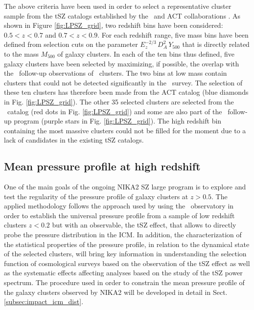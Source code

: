 \documentclass[twocolumn,traditabstract]{aa}
\begin{document}
The above criteria have been used in order to select a representative cluster sample from the tSZ catalogs established by the \planck\ and ACT collaborations \citep{pla16b,hil18}. As shown in Figure \ref{fig:LPSZ_grid}, two redshift bins have been considered: $0.5<z<0.7$ and $0.7<z<0.9$. For each redshift range, five mass bins have been defined from selection cuts on the parameter $E_z^{-2/3}\,D_A^2\,Y_{500}$ that is directly related to the mass $M_{500}$ of galaxy clusters. In each of the ten bins thus defined, five galaxy clusters have been selected by maximizing, if possible, the overlap with the \xmm\ follow-up observations of \planck\ clusters. The two bins at low mass contain clusters that could not be detected significantly in the \planck\ survey. The selection of these ten clusters has therefore been made from the ACT catalog (blue diamonds in Fig.  \ref{fig:LPSZ_grid}). The other 35 selected clusters are selected from the \planck\ catalog (red dots in Fig. \ref{fig:LPSZ_grid}) and some are also part of the \xmm\ follow-up program (purple stars in Fig. \ref{fig:LPSZ_grid}). The high redshift bin containing the most massive clusters could not be filled for the moment due to a lack of candidates in the existing tSZ catalogs.

\subsection{Mean pressure profile at high redshift}\label{subsec:goal_szlp}

One of the main goals of the ongoing NIKA2 SZ large program is to explore and test the regularity of the pressure profile of galaxy clusters at $z>0.5$. The applied methodology follows the approach used by \cite{arn10} using the \xmm\ observatory in order to establish the universal pressure profile from a sample of low redshift clusters $z<0.2$ but with an observable, the tSZ effect, that allows to directly probe the pressure distribution in the ICM. In addition, the characterization of the statistical properties of the pressure profile, in relation to the dynamical state of the selected clusters, will bring key information in understanding the selection function of cosmological surveys based on the observation of the tSZ effect as well as the systematic effects affecting analyses based on the study of the tSZ power spectrum. The procedure used in order to constrain the mean pressure profile of the galaxy clusters observed by NIKA2 will be developed in detail in Sect. \ref{subsec:impact_icm_dist}.
\end{document}
